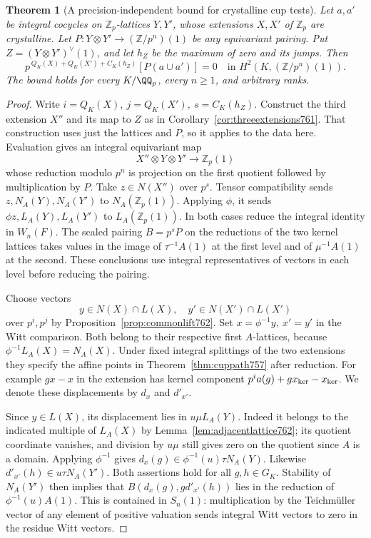\documentclass[a4paper,11pt]{article}
\newtheorem{theorem}[proposition]{Theorem}
\theoremstyle{definition}
\theoremstyle{remark}
\newcommand{\ZZ}{\mathbb Z}\newcommand{\ord}{\operatorname{ord}}
\numberwithin{equation}{section}
\begin{document}
\begin{theorem}[A precision-independent bound for crystalline cup tests]
\leavevmode\label{thm:unrestrictedcups762}
Let \(a,a'\) be integral cocycles on \(\ZZ_p\)-lattices
\(Y,Y'\), whose extensions \(X,X'\) of \(\ZZ_p\) are
crystalline. Let \(P:Y\otimes Y'\to(\ZZ/p^n)(1)\) be any
equivariant pairing. Put \(Z=(Y\otimes Y')^\vee(1)\), and
let \(h_Z\) be the maximum of zero and its jumps. Then
\[
   p^{\,Q_K(X)+Q_K(X')+C_K(h_Z)}[P(a\cup a')]=0
                   \quad\text{in }H^2(K,(\ZZ/p^n)(1)).
\]
The bound holds for every \(K/\QQ_p\), every \(n\ge1\),
and arbitrary ranks.
\end{theorem}
\begin{proof}
Write \(i=Q_K(X),\ j=Q_K(X'),\ s=C_K(h_Z)\). Construct
the third extension \(X''\) and its map to \(Z\) as in
Corollary~\ref{cor:threeextensions761}. That construction
uses just the lattices and \(P\), so it applies to the data
here. Evaluation gives an integral equivariant map
\[
       X''\otimes Y\otimes Y'\longrightarrow\ZZ_p(1)
\]
whose reduction modulo \(p^n\) is projection on the first
quotient followed by multiplication by \(P\). Take
\(z\in N(X'')\) over \(p^s\). Tensor compatibility sends
\(z,N_A(Y),N_A(Y')\) to \(N_A(\ZZ_p(1))\). Applying
\(\phi\), it sends \(\phi z,L_A(Y),L_A(Y')\) to
\(L_A(\ZZ_p(1))\). In both cases reduce the integral
identity in \(W_n(F)\). The scaled pairing \(B=p^sP\)
on the reductions of the two kernel lattices takes values
in the image of \(\tau^{-1}A(1)\) at the first level and
of \(\mu^{-1}A(1)\) at the second. These conclusions use
integral representatives of vectors in each level before
reducing the pairing.

Choose vectors
\[
 y\in N(X)\cap L(X),\quad y'\in N(X')\cap L(X')
\]
over \(p^i,p^j\) by Proposition~\ref{prop:commonlift762}.
Set \(x=\phi^{-1}y,\ x'=y'\) in the Witt comparison. Both
belong to their respective first \(A\)-lattices, because
\(\phi^{-1}L_A(X)=N_A(X)\). Under fixed integral
splittings of the two extensions they specify the affine
points in Theorem~\ref{thm:cuppath757} after reduction.
For example \(gx-x\) in the extension has kernel component
\(p^ia(g)+g x_{\rm ker}-x_{\rm ker}\). We denote these
displacements by \(d_x\) and \(d'_{x'}\).

Since \(y\in L(X)\), its displacement lies in \(u\mu L_A(Y)\).
Indeed it belongs to the indicated multiple of \(L_A(X)\)
by Lemma~\ref{lem:adjacentlattice762}; its quotient coordinate
vanishes, and division by \(u\mu\) still gives zero on the
quotient since \(A\) is a domain. Applying \(\phi^{-1}\)
gives \(d_x(g)\in\phi^{-1}(u)\tau N_A(Y)\).
Likewise \(d'_{x'}(h)\in u\tau N_A(Y')\).
Both assertions hold for all \(g,h\in G_K\).
Stability of \(N_A(Y')\) then implies that
\(B(d_x(g),g d'_{x'}(h))\) lies in the reduction of
\(\phi^{-1}(u)A(1)\). This is contained in \(S_n(1)\):
multiplication by the Teichm\"uller vector of any element of
positive valuation sends integral Witt vectors to zero in
the residue Witt vectors.


\end{proof}
\end{document}
